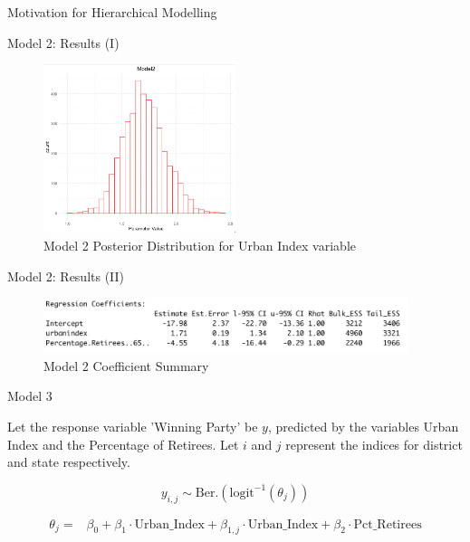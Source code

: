 \documentclass{beamer}
\begin{document}
\begin{frame}{Motivation for Hierarchical Modelling}
\begin{frame}{Model 2: Results (I)}
    \begin{figure}
        \caption{Model 2 Posterior Distribution for Urban Index variable}
        \includegraphics[width=0.5\textwidth]{plots/model2_postui.png}
    \end{figure}
\end{frame}


\begin{frame}{Model 2: Results (II)}
    \begin{figure}
                \caption{Model 2 Coefficient Summary}
        \includegraphics[width=0.95\textwidth]{plots/model2_coeff.png}
    \end{figure}
\end{frame}


\begin{frame}{Model 3}

    Let the response variable 'Winning Party' be \(y\), predicted by the variables Urban Index and the Percentage of Retirees. Let \(i\) and \(j\) represent the indices for district and state respectively.

    \[
    y_{i,j} \sim \text{Ber.}\left(\text{logit}^{-1}(\theta_{j})\right)
    \]

\[
\begin{aligned}
\theta_{j} =   &\beta_0 + \beta_1 \cdot \text{Urban\_Index} + \beta_{1,j} \cdot \text{Urban\_Index} + \beta_2 \cdot \text{Pct\_Retirees}
\end{aligned}
\]


\end{frame}
\end{frame}
\end{document}
